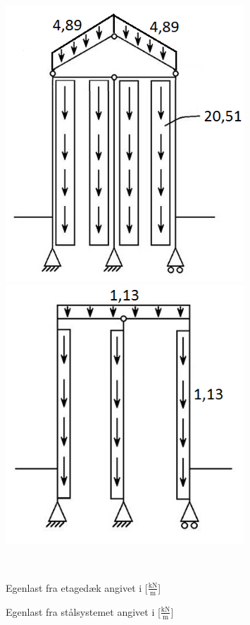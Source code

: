 \begin{figure}[H]\centering
	\begin{minipage}[b]{0.48\textwidth}\centering
		\includegraphics[width=0.80\textwidth]{billeder/egenlastetage.png} %
	\end{minipage}\hfill
	\begin{minipage}[b]{0.48\textwidth}\centering
		\includegraphics[width=0.8\textwidth]{billeder/egenlaststaal.png} %
	\end{minipage}\\ %
	\begin{minipage}[t]{0.48\textwidth}
		\caption{Egenlast fra etagedæk angivet i [$\frac{\text{kN}}{\text{m}}$]} %
		\label{fig:m}
	\end{minipage}\hfill
	\begin{minipage}[t]{0.48\textwidth}
		\caption{Egenlast fra stålsystemet angivet i [$\frac{\text{kN}}{\text{m}}$]} %
		\label{fig:n}
	\end{minipage}
\end{figure}

